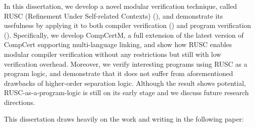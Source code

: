 In this dissertation, we develop a novel modular verification technique, called RUSC (Refinement
Under Self-related Contexts) (), and demonstrate its usefulness by applying it to
both compiler verification () and program verification ().
Specifically, we develop CompCertM, a full
extension of the latest version of CompCert supporting multi-language
linking, and show how RUSC enables modular compiler verification without any restrictions but still with low verification overhead.
Moreover, we verify interesting programs using RUSC as a program logic, and demonstrate that it does not suffer from aforementioned drawbacks of higher-order separation logic.
Although the result shows potential, RUSC-as-a-program-logic is still on its early stage and we discuss future research directions.


This dissertation draws heavily on the work and writing in the following paper: \cite{song:compcertm}

